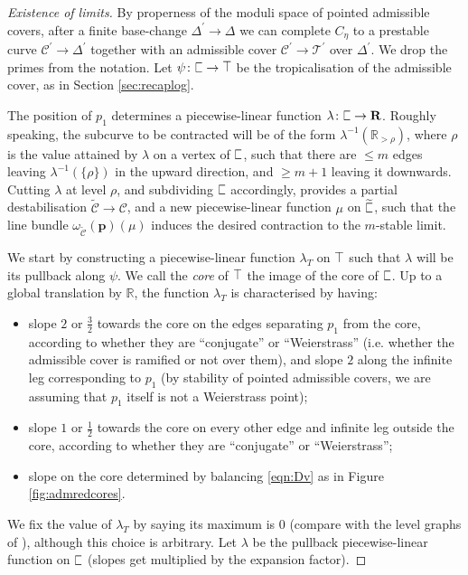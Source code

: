 \documentclass{compositio}
\newcommand{\tropC}{\scalebox{0.8}[1.3]{$\sqsubset$}}
\newcommand{\ttropC}{\widetilde{\tropC}}
\newcommand{\tropT}{\scalebox{0.9}[1.2]{$\top$}}
\renewcommand{\to}{\rightarrow}
\newcommand{\dvr}{\Delta}
\theoremstyle{plain}
\theoremstyle{definition}
\theoremstyle{remark}
\begin{document}
\begin{proof}[Existence of limits]

By properness of the moduli space of pointed admissible covers, after a finite base-change $\dvr^\prime\to\dvr$ we can complete $C_\eta$ to a prestable curve $\mathcal C^\prime\to\dvr^\prime$ together with an admissible cover $\mathcal C^\prime\to\mathcal T^\prime$ over $\dvr^\prime$. We drop the primes from the notation. Let $\psi\colon \tropC\to \tropT$ be the tropicalisation of the admissible cover, as in Section \ref{sec:recaplog}.

The position of $p_1$ determines a piecewise-linear function $\lambda\colon\tropC\to\mathbb R$. Roughly speaking, the subcurve to be contracted will be of the form $\lambda^{-1}(\mathbb R_{>\rho})$, where $\rho$ is the value attained by $\lambda$ on a vertex of $\tropC$, such that there are $\leq m$ edges leaving $\lambda^{-1}(\{\rho\})$ in the upward direction, and $\geq m+1$ leaving it downwards. Cutting $\lambda$ at level $\rho$, and subdividing $\tropC$ accordingly, provides a partial destabilisation $\widetilde{\mathcal C}\to\mathcal C$, and a new piecewise-linear function $\mu$ on $\ttropC$, such that the line bundle $\omega_{\widetilde{\mathcal C}}(\mathbf p)(\mu)$ induces the desired contraction to the $m$-stable limit.

We start by constructing a piecewise-linear function $\lambda_T$ on $\tropT$ such that $\lambda$ will be its pullback along $\psi$. We call the \emph{core} of $\tropT$ the image of the core of $\tropC$. Up to a global translation by $\mathbb R$, the function $\lambda_T$ is characterised by having:
\begin{itemize}
 \item slope $2$ or $\frac{3}{2}$ towards the core on the edges separating $p_1$ from the core, according to whether they are ``conjugate'' or ``Weierstrass'' (i.e. whether the admissible cover is ramified or not over them), and slope $2$ along the infinite leg corresponding to $p_1$ (by stability of pointed admissible covers, we are assuming that $p_1$ itself is not a Weierstrass point);
 \item slope $1$ or $\frac{1}{2}$ towards the core on every other edge and infinite leg outside the core, according to whether they are ``conjugate'' or ``Weierstrass'';
 \item slope on the core determined by balancing \eqref{eqn:Dv} as in Figure \ref{fig:admredcores}.
\end{itemize}
We fix the value of $\lambda_T$ by saying its maximum is $0$ (compare with the level graphs of \cite{BCGGM}), although this choice is arbitrary. Let $\lambda$ be the pullback piecewise-linear function on $\tropC$ (slopes get multiplied by the expansion factor).


\end{proof}
\end{document}
